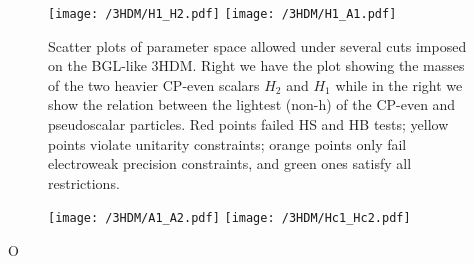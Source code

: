 \begin{comment}
\subsubsection{The CP-odd scalar sector}

\subsubsection{The CP-even or charged scalar sector}

\subsection{The Yukawa sector}

\subsection{The inverse procedure and the Quark masses}

\section{Constraints on the Model}

\section{Numerical Results}

\subsubsection{Higgs Plots}

\end{comment} 

\begin{figure}[H]
	\centering
	\texttt{[image: /3HDM/H1\_H2.pdf]}
	\texttt{[image: /3HDM/H1\_A1.pdf]}
	\caption{Scatter plots of parameter space allowed under  several cuts imposed on the BGL-like 3HDM. Right we have the plot showing the masses of the two heavier CP-even scalars $H_2$ and $H_1$ while in the right we show the relation between the lightest
(non-h) of the CP-even and pseudoscalar particles. Red points failed HS and HB tests; yellow points violate unitarity constraints; orange points only fail electroweak precision constraints, and green ones satisfy all restrictions.}
	\label{fig:H1_A1_Plots}
\end{figure}	

\begin{figure}[H]
	\centering
	\texttt{[image: /3HDM/A1\_A2.pdf]}
	\texttt{[image: /3HDM/Hc1\_Hc2.pdf]}
	\caption{}
	\label{fig:Other_H_plots}
\end{figure}	
%
O
%
